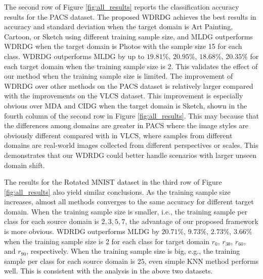 \documentclass[journal]{IEEEtran}
\begin{document}
The second row of Figure \ref{fig:all_results} reports the classification accuracy results for the PACS dataset.
The proposed WDRDG achieves the best results in accuracy and standard deviation when the target domain is Art Painting, Cartoon, or Sketch using different training sample size, and MLDG outperforms WDRDG when the target domain is Photos with the sample size 15 for each class. 
WDRDG outperforms MLDG by up to $19.81\%$, $20.95\%$, $18.68\%$, $20.35\%$ for each target domain when the training sample size is 2. 
This validates the effect of our method when the training sample size is limited. 
The improvement of WDRDG over other methods on the PACS dataset is relatively larger compared with the improvements on the VLCS dataset. This improvement is especially obvious over MDA and CIDG when the target domain is Sketch, shown in the fourth column of the second row in Figure \ref{fig:all_results}.
This may because that the differences among domains are greater in PACS where the image styles are obviously different compared with in VLCS, where samples from different domains are real-world images collected from different perspectives or scales. This demonstrates that our WDRDG could better handle scenarios with larger unseen domain shift. 



The results for the Rotated MNIST dataset in the third row of  Figure \ref{fig:all_results} also yield similar conclusions. As the training sample size increases, almost all methods converges to the same accuracy for different target domain.
When the training sample size is smaller, i.e., the training sample per class for each source domain is $2,3,5,7$, the advantage of  our proposed framework is more obvious. 
WDRDG outperforms MLDG by $20.71\%$, $9.73\%$, $2.73\%$, $3.66\%$ when the training sample size is 2 for each class for target domain $r_{0}$, $r_{30}$, $r_{60}$, and $r_{90}$, respectively.
When the training sample size is big, e.g., the training sample per class for each source domain is $25$, even simple KNN method performs well. 
This is consistent with the analysis in the above two datasets. 
\end{document}
